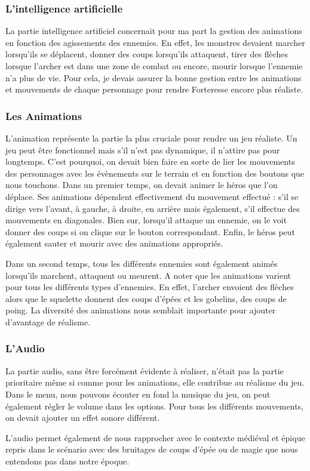 \documentclass[a4paper, 12pt]{article}
\begin{document}
		\subsubsection{L'intelligence artificielle}

La partie intelligence artificiel concernait pour ma part la gestion des animations en fonction des agissements des ennemies. En effet, les monstres devaient marcher lorsqu’ils se déplacent, donner des coups lorsqu’ils attaquent, tirer des flèches lorsque l’archer est dans une zone de combat ou encore, mourir lorsque l’ennemie n’a plus de vie. Pour cela, je devais assurer la bonne gestion entre les animations et mouvements de chaque personnage pour rendre Forteresse encore plus réaliste.

		\subsubsection{Les Animations}

L’animation représente la partie la plus cruciale pour rendre un jeu réaliste. Un jeu peut être fonctionnel mais s’il n’est pas dynamique, il n’attire pas pour longtemps. C’est pourquoi, on devait bien faire en sorte de lier les mouvements des personnages avec les évènements sur le terrain et en fonction des boutons que nous touchons. Dans un premier temps, on devait animer le héros que l’on déplace. Ses animations dépendent effectivement du mouvement effectué : s’il se dirige vers l’avant, à gauche, à droite, en arrière mais également, s’il effectue des mouvements en diagonales. Bien sur, lorsqu’il attaque un ennemie, on le voit donner des coups si on clique sur le bouton correspondant. Enfin, le héros peut également sauter et mourir avec des animations appropriés.
\par Dans un second temps, tous les différents ennemies sont également animés lorsqu’ils marchent, attaquent ou meurent. A noter que les animations varient pour tous les différents types d’ennemies. En effet, l’archer envoient des flèches alors que le squelette donnent des coups d’épées et les gobelins, des coups de poing. La diversité des animations nous semblait importante pour ajouter d’avantage de réalisme.

		\subsubsection{L'Audio}

La partie audio, sans être forcément évidente à réaliser, n’était pas la partie prioritaire même si comme pour les animations, elle contribue au réalisme du jeu. Dans le menu, nous pouvons écouter en fond la musique du jeu, on peut également régler le volume dans les options.
Pour tous les différents mouvements, on devait ajouter un effet sonore différent. 
\par L’audio permet également de nous rapprocher avec le contexte médiéval et épique repris dans le scénario avec des bruitages de coups d’épée ou de magie que nous entendons pas dans notre époque.
\end{document}
